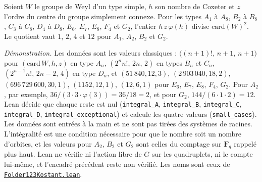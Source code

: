 \begin{encadre}
\begin{enonce}
Soient $W$ le groupe de Weyl d'un type simple, $h$ son nombre de Coxeter et $z$ l'ordre du centre du groupe simplement connexe. Pour les types $A_1$ à $A_8$, $B_2$ à $B_8$, $C_3$ à $C_8$, $D_4$ à $D_8$, $E_6$, $E_7$, $E_8$, $F_4$ et $G_2$, l'entier $h\,z\,\varphi(h)$ divise $\mathrm{card}(W)^2$. Le quotient vaut $1$, $2$, $4$ et $12$ pour $A_1$, $A_2$, $B_2$ et $G_2$.
\end{enonce}
\end{encadre}
{\small \emph{Démonstration.} Les données sont les valeurs classiques : $\bigl((n+1)!,\, n+1,\, n+1\bigr)$ pour $(\mathrm{card}\,W, h, z)$ en type $A_n$, $(2^n n!,\, 2n,\, 2)$ en types $B_n$ et $C_n$, $(2^{n-1} n!,\, 2n - 2,\, 4)$ en type $D_n$, et $(51\,840, 12, 3)$, $(2\,903\,040, 18, 2)$, $(696\,729\,600, 30, 1)$, $(1152, 12, 1)$, $(12, 6, 1)$ pour $E_6$, $E_7$, $E_8$, $F_4$, $G_2$. Pour $A_2$, par exemple, $36/(3 \cdot 3 \cdot \varphi(3)) = 36/18 = 2$, et pour $G_2$, $144/(6 \cdot 1 \cdot 2) = 12$. Lean décide que chaque reste est nul (\texttt{integral\_A}, \texttt{integral\_B}, \texttt{integral\_C}, \texttt{integral\_D}, \texttt{integral\_exceptional}) et calcule les quatre valeurs (\texttt{small\_cases}). Les données sont entrées à la main et ne sont pas tirées des systèmes de racines. L'intégralité est une condition nécessaire pour que le nombre soit un nombre d'orbites, et les valeurs pour $A_2$, $B_2$ et $G_2$ sont celles du comptage sur $\mathbf F_q$ rappelé plus haut. Lean ne vérifie ni l'action libre de $G$ sur les quadruplets, ni le compte lui-même, et l'encadré précédent reste non vérifié. Les noms sont ceux de \href{\leanblobmain/RepresentationTheory/Folder123Kostant.lean}{\texttt{Folder123Kostant.\allowbreak{}lean}}.\par}

